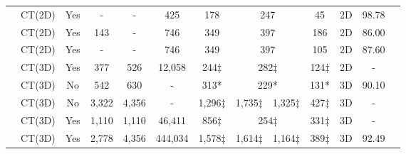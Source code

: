 \documentclass[letterpaper]{article}
\begin{document}
\begin{table}[!ht]
{\begin{tabular}{|c|c|c|c|c|c|c|c|c|c|c|c|c|}
 \cite{Alom} & CT(2D) & Yes & - & - & 425 & 178 & \multicolumn{2}{c|}{247} & 45 & 2D & 98.78 \\\cline{8-9}
 \cite{He2020} & CT(2D) & Yes & 143 & - & 746 & 349 & \multicolumn{2}{c|}{397} & 186 & 2D & 86.00  \\\cline{8-9}
 \cite{Mobiny2020} & CT(2D) & Yes & - & - & 746 & 349 & \multicolumn{2}{c|}{397} & 105 & 2D & 87.60 \\\cline{8-9}
 \cite{covid-ctset} & CT(3D) & Yes & 377 & 526 & 12,058 & 244$\ddagger$ & \multicolumn{2}{c|}{282$\ddagger$} & {124$\ddagger$} & 2D & - \\\cline{8-9}
 \cite{Zheng2020} & CT(3D) & No & 542 & 630 & - & 313* & \multicolumn{2}{c|}{229*} & {131*} & 3D & 90.10 \\\cline{8-9}
 \cite{li2020artificial} & CT(3D) & No & 3,322 & 4,356 & - & 1,296$\ddagger$ & 1,735$\ddagger$& 1,325$\ddagger$ & 427$\ddagger$ & 3D & - \\\cline{8-9}
 \cite{mosmeddata} & CT(3D) & Yes & 1,110 & 1,110 & 46,411 & 856$\ddagger$ & \multicolumn{2}{c|}{254$\ddagger$} & {331$\ddagger$} & 3D & - \\\cline{8-9}


 \cite{cell_covid} & CT(3D) & Yes & 2,778 & 4,356 & 444,034 & 1,578$\ddagger$ & 1,614$\ddagger$ & 1,164$\ddagger$ & 389$\ddagger$ & 3D & 92.49\\\hline
\end{tabular}
}
\label{table:dataset_review}
\end{table}
\end{document}

